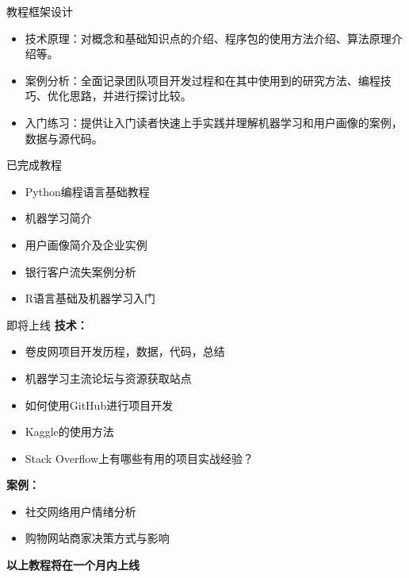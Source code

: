 \documentclass[10pt,aspectratio=32,handout]{beamer}
\begin{document}
\begin{frame}{教程框架设计}
\begin{itemize}
\item 技术原理：对概念和基础知识点的介绍、程序包的使用方法介绍、算法原理介绍等。\newline
\item 案例分析：全面记录团队项目开发过程和在其中使用到的研究方法、编程技巧、优化思路，并进行探讨比较。\newline
\item 入门练习：提供让入门读者快速上手实践并理解机器学习和用户画像的案例，数据与源代码。\newline
\end{itemize}
\end{frame}

\begin{frame}{已完成教程}
  \begin{itemize}
    \item Python编程语言基础教程\newline
    \item 机器学习简介\newline
    \item 用户画像简介及企业实例\newline
    \item 银行客户流失案例分析\newline
    \item R语言基础及机器学习入门\newline
  \end{itemize}
\end{frame}

\begin{frame}{即将上线}
\textbf{技术：}
  \begin{itemize}
    \item 卷皮网项目开发历程，数据，代码，总结
    \item 机器学习主流论坛与资源获取站点
    \item 如何使用GitHub进行项目开发
    \item Kaggle的使用方法
    \item Stack Overflow上有哪些有用的项目实战经验？\newline
  \end{itemize}
\textbf{案例：}
  \begin{itemize}
  \item 社交网络用户情绪分析
  \item 购物网站商家决策方式与影响\newline
  \end{itemize}
  \textbf{以上教程将在一个月内上线}
\end{frame}
\end{document}
